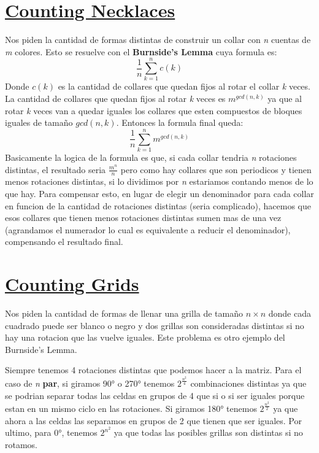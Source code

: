 \documentclass{article}
\begin{document}
\section{\href{https://cses.fi/problemset/task/2209}{Counting Necklaces}}
Nos piden la cantidad de formas distintas de construir un collar con \textit{n} cuentas de \textit{m} colores. Esto se resuelve con el \textbf{Burnside's Lemma} cuya formula es:
\[\frac{1}{n}\sum_{k=1}^{n}c(k)\]
Donde $c(k)$ es la cantidad de collares que quedan fijos al rotar el collar \textit{k} veces. La cantidad de collares que quedan fijos al rotar \textit{k} veces es $m^{gcd(n, k)}$ ya que al rotar \textit{k} veces van a quedar iguales los collares que esten compuestos de bloques iguales de tamaño $gcd(n, k)$. Entonces la formula final queda:
\[\frac{1}{n}\sum_{k=1}^{n}m^{gcd(n, k)}\]
Basicamente la logica de la formula es que, si cada collar tendria \textit{n} rotaciones distintas, el resultado seria $\frac{m^n}{n}$ pero como hay collares que son periodicos y tienen menos rotaciones distintas, si lo dividimos por \textit{n} estariamos contando menos de lo que hay. Para compensar esto, en lugar de elegir un denominador para cada collar en funcion de la cantidad de rotaciones distintas (seria complicado), hacemos que esos collares que tienen menos rotaciones distintas sumen mas de una vez (agrandamos el numerador lo cual es equivalente a reducir el denominador), compensando el resultado final.

\section{\href{https://cses.fi/problemset/task/2210}{Counting Grids}}
Nos piden la cantidad de formas de llenar una grilla de tamaño $n \times n$ donde cada cuadrado puede ser blanco o negro y dos grillas son consideradas distintas si no hay una rotacion que las vuelve iguales. Este problema es otro ejemplo del Burnside's Lemma.

Siempre tenemos 4 rotaciones distintas que podemos hacer a la matriz.
Para el caso de \textit{n} \textbf{par}, si giramos 90° o 270° tenemos $2^{\frac{n^2}{4}}$ combinaciones distintas ya que se podrian separar todas las celdas en grupos de 4 que si o si ser iguales porque estan en un mismo ciclo en las rotaciones.
Si giramos 180° tenemos $2^{\frac{n^2}{2}}$ ya que ahora a las celdas las separamos en grupos de 2 que tienen que ser iguales. Por ultimo, para 0°, tenemos $2^{n^2}$ ya que todas las posibles grillas son distintas si no rotamos.
\end{document}
